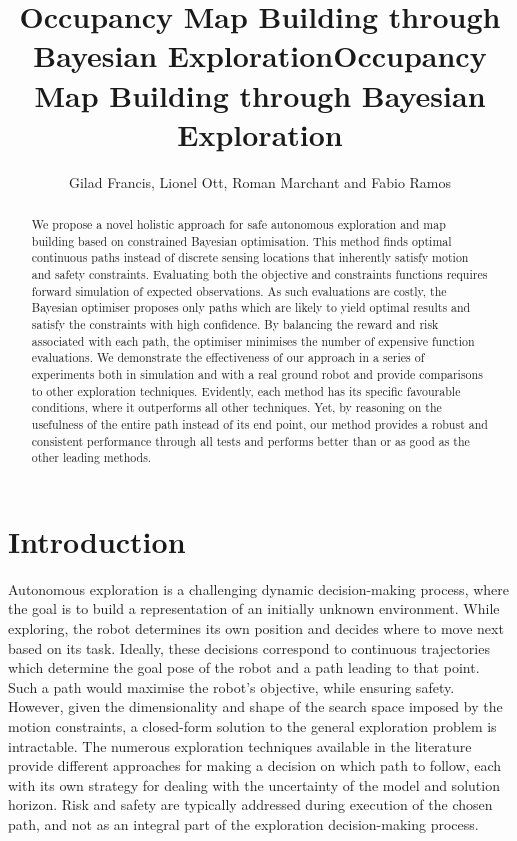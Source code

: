 \documentclass[shortAfour,sageh,times]{sagej_no_sage}
\title{Occupancy Map Building through Bayesian Exploration}
\author{Gilad Francis, Lionel Ott, Roman Marchant and Fabio Ramos}
\affiliation{School of Information Technologies, University of Sydney, Australia}
\begin{document}

\title{Occupancy Map Building through Bayesian Exploration}


\begin{abstract}
We propose a novel holistic approach for safe autonomous exploration and map building based on constrained Bayesian optimisation. 
This method finds optimal continuous paths instead of discrete sensing locations that inherently satisfy motion and safety constraints. 
Evaluating both the objective and constraints functions requires forward simulation of expected observations. As such evaluations are costly, the Bayesian optimiser proposes only paths which are likely to yield optimal results and satisfy the constraints with high confidence. By balancing the reward and risk associated with each path, the optimiser minimises the number of expensive function evaluations. We demonstrate the effectiveness of our approach in a series of experiments both in simulation and with a real ground robot and provide comparisons to other exploration techniques. Evidently, each method has its specific favourable conditions, where it outperforms all other techniques. Yet, by reasoning on the usefulness of the entire path instead of its end point, our method provides a robust and consistent performance through all tests and performs better than or as good as the other leading methods.
\end{abstract}


\maketitle

\section{Introduction}

Autonomous exploration is a challenging dynamic decision-making process, where the goal is to build a representation of an initially unknown environment. While exploring, the robot determines its own position and decides where to move next based on its task. Ideally, these decisions correspond to continuous trajectories which determine the goal pose of the robot and a path leading to that point. Such a path would maximise the robot's objective, while ensuring safety. However, given the dimensionality and shape of the search space imposed by the motion constraints, a closed-form solution to the general exploration problem is intractable. The numerous exploration techniques available in the literature provide different approaches for making a decision on which path to follow, each with its own strategy for dealing with the uncertainty of the model and solution horizon. Risk and safety are typically addressed during execution of the chosen path, and not as an integral part of the exploration decision-making process.
\end{document}
